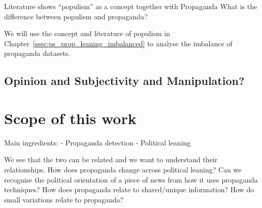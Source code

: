 Literature shows “populism” as a concept together with Propaganda
What is the difference between populism and propaganda?


We will use the concept and literature of \gls{populism} in Chapter~\ref{ssec:ps_prop_leaning_imbalanced} to analyse the imbalance of propaganda datasets.


\subsection{Opinion and Subjectivity and Manipulation?}

\section{Scope of this work}

Main ingredients:
- Propaganda detection
- Political leaning

We see that the two can be related and we want to understand their relationships.
How does propaganda change across political leaning?
Can we recognise the political orientation of a piece of news from how it uses propaganda techniques?
How does propaganda relate to shared/unique information? How do small variations relate to propaganda?
